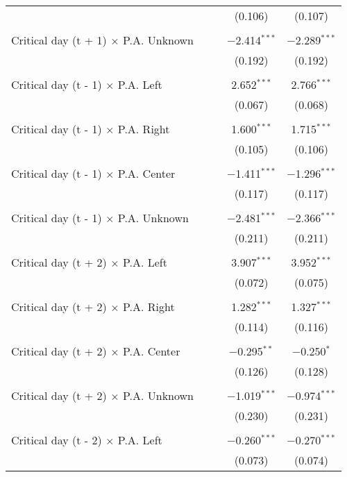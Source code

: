 \documentclass[
]{article}
\begin{document}
\begin{table}[!htbp]
{\begin{tabular}{@{\extracolsep{5pt}}lcccc}
  &  &  & (0.106) & (0.107) \\ 
  & & & & \\ 
 Critical day (t + 1) $\times$ P.A. Unknown &  &  & $-$2.414$^{***}$ & $-$2.289$^{***}$ \\ 
  &  &  & (0.192) & (0.192) \\ 
  & & & & \\ 
 Critical day (t - 1) $\times$ P.A. Left &  &  & 2.652$^{***}$ & 2.766$^{***}$ \\ 
  &  &  & (0.067) & (0.068) \\ 
  & & & & \\ 
 Critical day (t - 1) $\times$ P.A. Right &  &  & 1.600$^{***}$ & 1.715$^{***}$ \\ 
  &  &  & (0.105) & (0.106) \\ 
  & & & & \\ 
 Critical day (t - 1) $\times$ P.A. Center &  &  & $-$1.411$^{***}$ & $-$1.296$^{***}$ \\ 
  &  &  & (0.117) & (0.117) \\ 
  & & & & \\ 
 Critical day (t - 1) $\times$ P.A. Unknown &  &  & $-$2.481$^{***}$ & $-$2.366$^{***}$ \\ 
  &  &  & (0.211) & (0.211) \\ 
  & & & & \\ 
 Critical day (t + 2) $\times$ P.A. Left &  &  & 3.907$^{***}$ & 3.952$^{***}$ \\ 
  &  &  & (0.072) & (0.075) \\ 
  & & & & \\ 
 Critical day (t + 2) $\times$ P.A. Right &  &  & 1.282$^{***}$ & 1.327$^{***}$ \\ 
  &  &  & (0.114) & (0.116) \\ 
  & & & & \\ 
 Critical day (t + 2) $\times$ P.A. Center &  &  & $-$0.295$^{**}$ & $-$0.250$^{*}$ \\ 
  &  &  & (0.126) & (0.128) \\ 
  & & & & \\ 
 Critical day (t + 2) $\times$ P.A. Unknown &  &  & $-$1.019$^{***}$ & $-$0.974$^{***}$ \\ 
  &  &  & (0.230) & (0.231) \\ 
  & & & & \\ 
 Critical day (t - 2) $\times$ P.A. Left &  &  & $-$0.260$^{***}$ & $-$0.270$^{***}$ \\ 
  &  &  & (0.073) & (0.074) \\ 

\end{tabular}}
\end{table}
\end{document}
